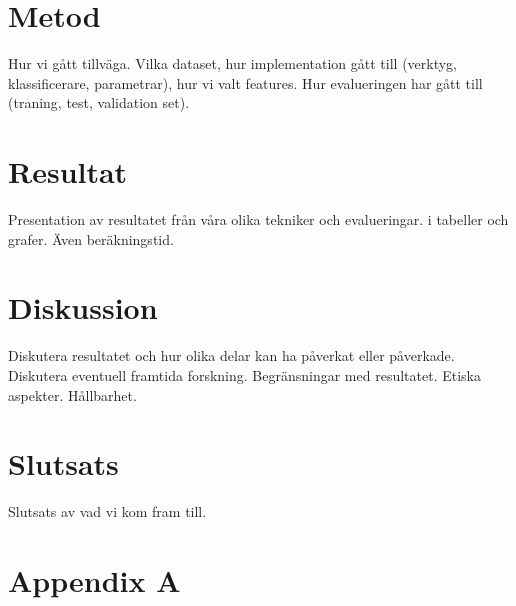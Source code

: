 \documentclass{kththesis}
\begin{document}
\chapter{Metod}
Hur vi gått tillväga. Vilka dataset, hur implementation gått till (verktyg, klassificerare, parametrar), hur vi valt features.
Hur evalueringen har gått till (traning, test, validation set).

\chapter{Resultat}
Presentation av resultatet från våra olika tekniker och evalueringar. i tabeller och grafer. Även beräkningstid. 

\chapter{Diskussion}
Diskutera resultatet och hur olika delar kan ha påverkat eller påverkade. Diskutera eventuell framtida forskning. Begränsningar med resultatet.
Etiska aspekter. Hållbarhet. 

\chapter{Slutsats}
Slutsats av vad vi kom fram till.

\printbibliography[heading=bibintoc]
\appendix
  \chapter{Appendix A}

\tailmatter
\end{document}
